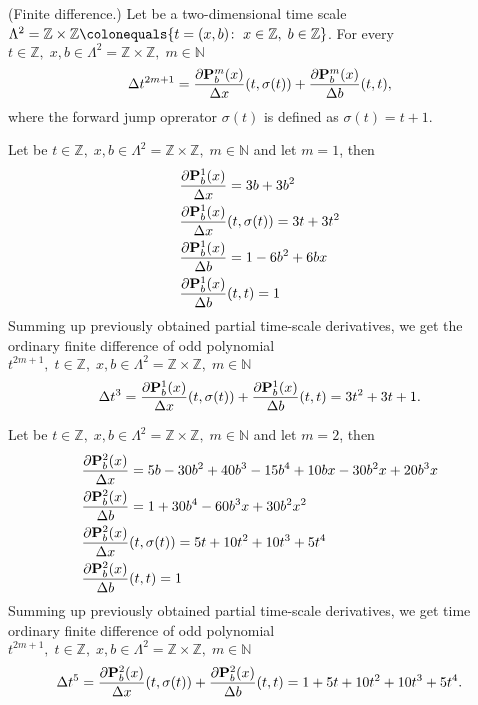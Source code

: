 \begin{cor}
    \label{finite_difference_case}
    (Finite difference.)
    Let be a two-dimensional time scale
    $\Lambda^2 = \mathbb{Z} \times \mathbb{Z} \colonequals \{t=(x, b) \colon \; x\in \mathbb{Z}, \; b\in \mathbb{Z} \}$.
    For every $t\in\mathbb{Z}, \; x,b\in \Lambda^2 = \mathbb{Z} \times \mathbb{Z}, \; m\in\mathbb{N}$
    \[
        \Delta t^{2m+1}
        = \frac{\partial {\mathbf{P}}\sp{m} \sb{b}(x)}{\Delta x}(t, \sigma(t))
        + \frac{\partial {\mathbf{P}}\sp{m} \sb{b}(x)}{\Delta b}(t, t),
    \]
    where the forward jump oprerator $\sigma(t)$ is defined as $\sigma(t) = t+1$.
\end{cor}
\begin{examp}
    Let be $t\in\mathbb{Z}, \;x,b\in\Lambda^2 = \mathbb{Z} \times \mathbb{Z}, \; m\in\mathbb{N}$ and let $m=1$, then
    \begin{align*}
        &\frac{\partial {\mathbf{P}}\sp{1} \sb{b}(x)}{\Delta x} = 3 b + 3 b^2 \\
        &\frac{\partial {\mathbf{P}}\sp{1} \sb{b}(x)}{\Delta x}(t, \sigma(t)) = 3 t + 3 t^2\\
        &\frac{\partial {\mathbf{P}}\sp{1} \sb{b}(x)}{\Delta b}= 1 - 6 b^2 + 6 b x\\
        &\frac{\partial {\mathbf{P}}\sp{1} \sb{b}(x)}{\Delta b}(t, t) = 1
    \end{align*}
    Summing up previously obtained partial time-scale derivatives, we get the ordinary finite difference of odd polynomial
    $t^{2m+1}, \; t\in\mathbb{Z}, \; x,b\in\Lambda^2 = \mathbb{Z} \times \mathbb{Z}, \; m\in\mathbb{N}$
    \[
        \Delta t^{3}
        = \frac{\partial {\mathbf{P}}\sp{1} \sb{b}(x)}{\Delta x}(t, \sigma(t)) + \frac{\partial {\mathbf{P}}\sp{1} \sb{b}(x)}{\Delta b}(t, t)
        = 3 t^2 + 3 t + 1.
    \]
\end{examp}
\begin{examp}
    Let be $t\in\mathbb{Z}, \;x,b\in\Lambda^2 = \mathbb{Z} \times \mathbb{Z}, \; m\in\mathbb{N}$
    and let $m=2$, then
    \begin{align*}
        &\frac{\partial {\mathbf{P}}\sp{2} \sb{b}(x)}{\Delta x} = 5 b - 30 b^2 + 40 b^3 - 15 b^4 + 10 b x - 30 b^2 x + 20 b^3 x \\
        &\frac{\partial {\mathbf{P}}\sp{2} \sb{b}(x)}{\Delta b} = 1 + 30 b^4 - 60 b^3 x + 30 b^2 x^2 \\
        &\frac{\partial {\mathbf{P}}\sp{2} \sb{b}(x)}{\Delta x}(t, \sigma(t)) = 5 t + 10 t^2 + 10 t^3 + 5 t^4 \\
        &\frac{\partial {\mathbf{P}}\sp{2} \sb{b}(x)}{\Delta b}(t, t) = 1
    \end{align*}
    Summing up previously obtained partial time-scale derivatives, we get time ordinary finite difference of odd polynomial
    $t^{2m+1}, \; t\in\mathbb{Z}, \;x,b\in\Lambda^2 = \mathbb{Z} \times \mathbb{Z}, \; m\in\mathbb{N}$
    \[
        \Delta t^{5}
        = \frac{\partial {\mathbf{P}}\sp{2} \sb{b}(x)}{\Delta x}(t, \sigma(t)) + \frac{\partial {\mathbf{P}}\sp{2} \sb{b}(x)}{\Delta b}(t, t)
        = 1 + 5 t + 10 t^2 + 10 t^3 + 5 t^4.
    \]
\end{examp}
